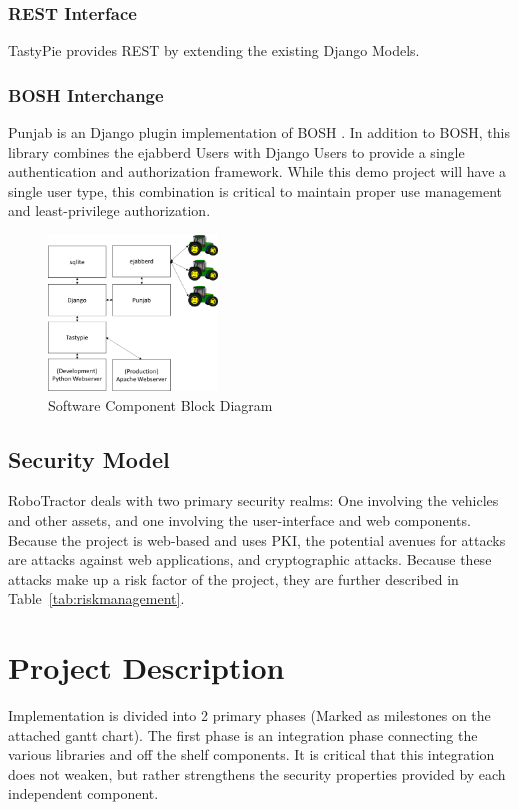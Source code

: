 \documentclass[conference,12pt]{IEEEtran}
\begin{document}
\subsubsection{REST Interface}
TastyPie provides REST \autocite{_toastdriven/django-tastypie_2014} by extending
the existing Django Models.
\subsubsection{BOSH Interchange}
Punjab is an Django plugin implementation of BOSH
\autocite{_twonds/punjab_2014}.  In addition to BOSH, this library combines
the ejabberd Users with Django Users to provide a single authentication and
authorization framework. While this demo project will have a single user type,
this combination is critical to maintain proper use management and
least-privilege authorization.

\begin{figure}
\centering
\includegraphics[width=0.4\textwidth]{SoftwareComponentBlockDiagram.pdf}
\caption{Software Component Block Diagram}
\label{fig:softwarecomponents}
\end{figure}

\subsection{Security Model}
RoboTractor deals with two primary security realms: One involving the vehicles
and other assets, and one involving the user-interface and web components.
Because the project is web-based and uses PKI, the potential avenues for
attacks are attacks against web applications, and cryptographic attacks.
Because these attacks make up a risk factor of the project, they are further
described in Table~\ref{tab:riskmanagement}. 

\section{Project Description}
Implementation is divided into 2 primary phases (Marked as milestones on the
attached gantt chart).  The first phase is an integration phase connecting
the various libraries and off the shelf components. It is critical that this
integration does not weaken, but rather strengthens the security properties
provided by each independent component. 
\end{document}
